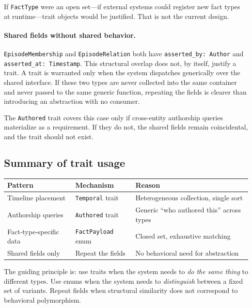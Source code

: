 \documentclass[11pt]{article}
\begin{document}
If \texttt{FactType} were an open set---if external systems could register
new fact types at runtime---trait objects would be justified. That is not the
current design.

\paragraph{Shared fields without shared behavior.}
\texttt{EpisodeMembership} and \texttt{EpisodeRelation} both have
\texttt{asserted\_by: Author} and \texttt{asserted\_at: Timestamp}. This
structural overlap does not, by itself, justify a trait. A trait is warranted
only when the system dispatches generically over the shared interface. If
these two types are never collected into the same container and never passed
to the same generic function, repeating the fields is clearer than
introducing an abstraction with no consumer.

The \texttt{Authored} trait covers this case only if cross-entity authorship
queries materialize as a requirement. If they do not, the shared fields
remain coincidental, and the trait should not exist.

\subsection{Summary of trait usage}

\begin{center}
\renewcommand{\arraystretch}{1.3}
\begin{tabular}{l l l}
\textbf{Pattern} & \textbf{Mechanism} & \textbf{Reason} \\
\hline
Timeline placement & \texttt{Temporal} trait &
  Heterogeneous collection, single sort \\
Authorship queries & \texttt{Authored} trait &
  Generic ``who authored this'' across types \\
Fact-type-specific data & \texttt{FactPayload} enum &
  Closed set, exhaustive matching \\
Shared fields only & Repeat the fields &
  No behavioral need for abstraction \\
\end{tabular}
\end{center}

The guiding principle is: use traits when the system needs to \emph{do the
same thing} to different types. Use enums when the system needs to
\emph{distinguish} between a fixed set of variants. Repeat fields when
structural similarity does not correspond to behavioral polymorphism.
\end{document}
